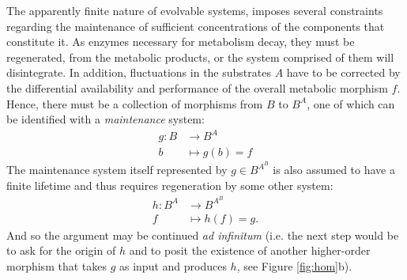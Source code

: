 The apparently finite nature of evolvable systems, imposes several constraints regarding the maintenance of sufficient concentrations of the components that constitute it. As enzymes necessary for metabolism decay, they must be regenerated, from the metabolic products, or the system comprised of them will disintegrate. In addition, fluctuations in the substrates $A$ have to be corrected by the differential availability and performance of the overall metabolic morphism $f$. Hence, there must be a collection of morphisms from $B$ to $B^A$, one of which can be identified with a \emph{maintenance} system:
\begin{align*}
g \colon B &\longrightarrow B^A\\
b &\longmapsto g(b)=f
\end{align*}
The maintenance system itself represented by $g \in B^{A^B}$ is also assumed to have a finite lifetime and thus requires regeneration by some other system:
\begin{align*}
h \colon B^A & \longrightarrow B^{A^B}\\
f & \longmapsto h(f)=g.
\end{align*}	
And so the argument may be continued \emph{ad infinitum} (i.e. the next step would be to ask for the origin of $h$ and to posit the existence of another higher-order morphism that takes $g$ as input and produces $h$, see Figure \ref{fig:hom}b). 

